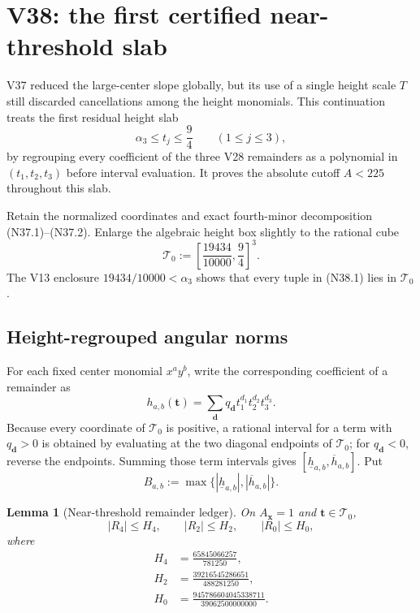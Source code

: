 \documentclass[11pt]{article}
\newtheorem{lemma}[theorem]{Lemma}
\theoremstyle{definition}
\theoremstyle{remark}
\begin{document}

\section{V38: the first certified near-threshold slab}
\label{sec:f2v38-near-threshold}

V37 reduced the large-center slope globally, but its use of a single
height scale \(T\) still discarded cancellations among the height
monomials.  This continuation treats the first residual height slab
\[
 \alpha_3\leq t_j\leq\frac94\qquad(1\leq j\leq3),
\tag{N38.1}
\]
by regrouping every coefficient of the three V28 remainders as a
polynomial in \((t_1,t_2,t_3)\) before interval evaluation.  It proves the
absolute cutoff \(A<225\) throughout this slab.

Retain the normalized coordinates and exact fourth-minor decomposition
\textup{(N37.1)}--\textup{(N37.2)}.  Enlarge the algebraic height box
slightly to the rational cube
\[
 \mathcal T_0:=
 \left[\frac{19434}{10000},\frac94\right]^3.
\tag{N38.2}
\]
The V13 enclosure \(19434/10000<\alpha_3\) shows that every tuple in
\textup{(N38.1)} lies in \(\mathcal T_0\).

\subsection{Height-regrouped angular norms}

For each fixed center monomial \(x^ay^b\), write the corresponding
coefficient of a remainder as
\[
 h_{a,b}(\bm t)=
 \sum_{\bm d}q_{\bm d}
 t_1^{d_1}t_2^{d_2}t_3^{d_3}.
\tag{N38.3}
\]
Because every coordinate of \(\mathcal T_0\) is positive, a rational
interval for a term with \(q_{\bm d}>0\) is obtained by evaluating at the
two diagonal endpoints of \(\mathcal T_0\); for
\(q_{\bm d}<0\), reverse the endpoints.  Summing those term intervals gives
\([\underline h_{a,b},\overline h_{a,b}]\).  Put
\[
 B_{a,b}:=\max\{|\underline h_{a,b}|,
                    |\overline h_{a,b}|\}.
\tag{N38.4}
\]

\begin{lemma}[Near-threshold remainder ledger]
\label{lem:f2v38-remainders}
On \(A_{\bm x}=1\) and \(\bm t\in\mathcal T_0\),
\[
 |R_4|\leq H_4,\qquad |R_2|\leq H_2,
 \qquad |R_0|\leq H_0,
\tag{N38.5}
\]
where
\[
\boxed{
\begin{aligned}
 H_4&=\frac{65845066257}{781250},\\
 H_2&=\frac{39216545286651}{488281250},\\
 H_0&=\frac{945786604045338711}{39062500000000}.
\end{aligned}}
\tag{N38.6}
\]
\end{lemma}
\end{document}

